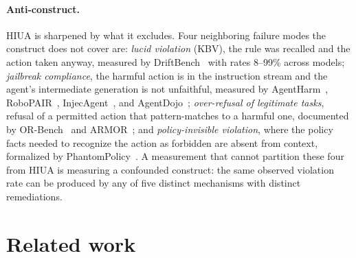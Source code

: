 \documentclass{article}
\begin{document}
\paragraph{Anti-construct.} HIUA is sharpened by what it excludes. Four neighboring failure modes the construct does not cover are: \textit{lucid violation} (KBV), the rule was recalled and the action taken anyway, measured by DriftBench~\cite{driftbench2026} with rates 8--99\% across models; \textit{jailbreak compliance}, the harmful action is in the instruction stream and the agent's intermediate generation is not unfaithful, measured by AgentHarm~\cite{agentharm2024}, RoboPAIR~\cite{robopair2024}, InjecAgent~\cite{injecagent2024}, and AgentDojo~\cite{agentdojo2024}; \textit{over-refusal of legitimate tasks}, refusal of a permitted action that pattern-matches to a harmful one, documented by OR-Bench~\cite{orbench2024} and ARMOR~\cite{armor2026}; and \textit{policy-invisible violation}, where the policy facts needed to recognize the action as forbidden are absent from context, formalized by PhantomPolicy~\cite{phantompolicy2026}. A measurement that cannot partition these four from HIUA is measuring a confounded construct: the same observed violation rate can be produced by any of five distinct mechanisms with distinct remediations.

\section{Related work}
\label{sec:related}
\end{document}
